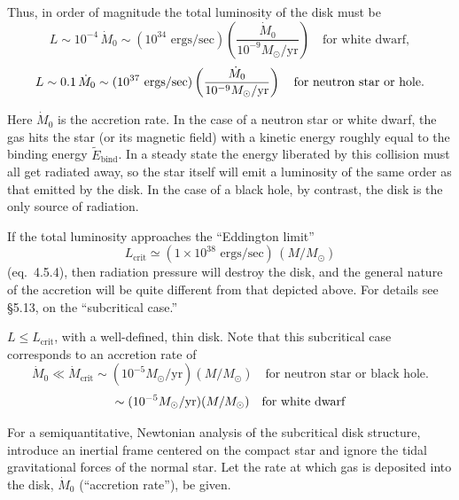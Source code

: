 Thus, in order of magnitude the total luminosity of the disk must be
\begin{equation}
L \sim 10^{-4}\,\dot{M}_0 \sim (10^{34} \text{ ergs/sec})
\left(\frac{\dot{M}_0}{10^{-9} M_\odot/\text{yr}}\right)
\quad \text{for white dwarf},
\tag{5.2.10}
\end{equation}
\begin{equation}
L \sim 0.1\,\dot{M}_0 \sim (10^{37} \text{ ergs/sec})
\left(\frac{\dot{M}_0}{10^{-9} M_\odot/\text{yr}}\right)
\quad \text{for neutron star or hole}.
\notag
\end{equation}

Here $\dot{M}_0$ is the accretion rate. In the case of a neutron star or white dwarf, the
gas hits the star (or its magnetic field) with a kinetic energy roughly equal to the
binding energy $\tilde{E}_{\text{bind}}$. In a steady state the energy liberated by this collision
must all get radiated away, so the star itself will emit a luminosity of the same
order as that emitted by the disk. In the case of a black hole, by contrast, the
disk is the only source of radiation.

If the total luminosity approaches the ``Eddington limit''
\begin{equation}
L_{\text{crit}} \simeq (1 \times 10^{38} \text{ ergs/sec})\,(M/M_\odot)
\tag{5.2.11a}
\end{equation}
(eq.~4.5.4), then radiation pressure will destroy the disk, and the general nature
of the accretion will be quite different from that depicted above. For details
see \S5.13, on the ``subcritical case.''

$L \leq L_{\text{crit}}$, with a well-defined, thin disk. Note that this subcritical case
corresponds to an accretion rate of
\begin{equation}
\dot{M}_0 \ll \dot{M}_{\text{crit}} \sim (10^{-5} M_\odot/\text{yr})(M/M_\odot)
\quad \text{for neutron star or black hole}.
\tag{5.2.11b}
\end{equation}
\begin{equation}
\sim (10^{-5} M_\odot/\text{yr})(M/M_\odot)
\quad \text{for white dwarf}
\notag
\end{equation}

For a semiquantitative, Newtonian analysis of the subcritical disk structure,
introduce an inertial frame centered on the compact star and ignore the tidal
gravitational forces of the normal star. Let the rate at which gas is deposited
into the disk, $\dot{M}_0$ (``accretion rate''), be given.

